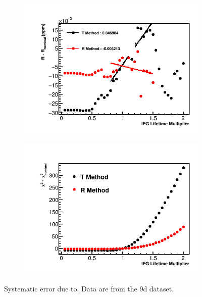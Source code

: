 \begin{figure}[h]
\centering
    \begin{subfigure}[t]{0.45\textwidth}
        \centering
        \includegraphics[width=\textwidth]{IFG_Lifetime_Compare_R_9d}
        \caption{}
    \end{subfigure}%
    \hspace{1cm}
    \begin{subfigure}[t]{0.45\textwidth}
        \centering
        \includegraphics[width=\textwidth]{IFG_Lifetime_Compare_Chisq_9d}
        \caption{}
    \end{subfigure}
\caption[]{Systematic error due to. Data are from the 9d dataset.}
\label{fig:IFGAmpscan}
\end{figure}


